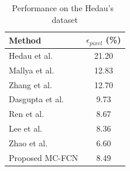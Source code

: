\begin{table}
	\centering 
	\begin{tabular}{lc}
		\toprule
		Method & $\epsilon_{pixel}$ (\%) \\
		\midrule
		Hedau et al.~\cite{hedau2009recovering} & 21.20 \\
		Mallya et al.~\cite{mallya2015learning} & 12.83 \\
		Zhang et al.~\cite{zhang2017learning} & 12.70 \\
		Dasgupta et al.~\cite{dasgupta2016delay} & 9.73 \\
		Ren et al.~\cite{ren2016coarse} & 8.67 \\
		Lee et al.~\cite{LeeRoomNet17} & 8.36 \\
		Zhao et al.~\cite{zhao2017physics} & 6.60 \\
		\midrule
		Proposed MC-FCN & 8.49 \\
		\bottomrule
	\end{tabular}
	\caption{Performance on the Hedau's~\cite{hedau2009recovering} dataset}
	\label{table:comparison-hedau}
\end{table}



